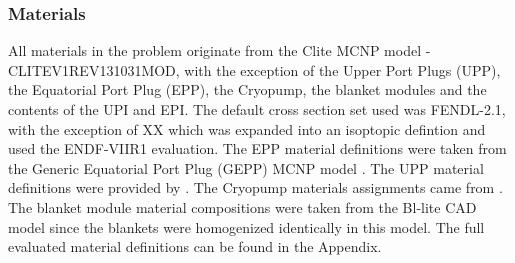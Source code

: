 \documentclass[12pt]{article}
\begin{document}
\newpage
\clearpage
\subsubsection{Materials}
All materials in the problem originate from the Clite MCNP model -
CLITE\textunderscore V1\textunderscore REV131031\textunderscore MOD, with the
exception of the Upper Port Plugs (UPP), the Equatorial Port Plug (EPP), the
Cryopump, the blanket modules and the contents of the UPI and EPI. The default
cross section set used was FENDL-2.1, with the exception of XX which was
expanded into an isoptopic defintion and used the ENDF-VIIR1 evaluation. The EPP
material definitions were taken from the Generic Equatorial Port Plug (GEPP)
MCNP model \cite{epp_materials}. The UPP material definitions were provided by
\cite{bertalot_communication}. The Cryopump materials assignments came from
\cite{cryopump_communication}. The blanket module material compositions were
taken from the Bl-lite CAD model since the blankets were homogenized identically
in this model. The full evaluated material definitions can be found in the
Appendix.
\end{document}
